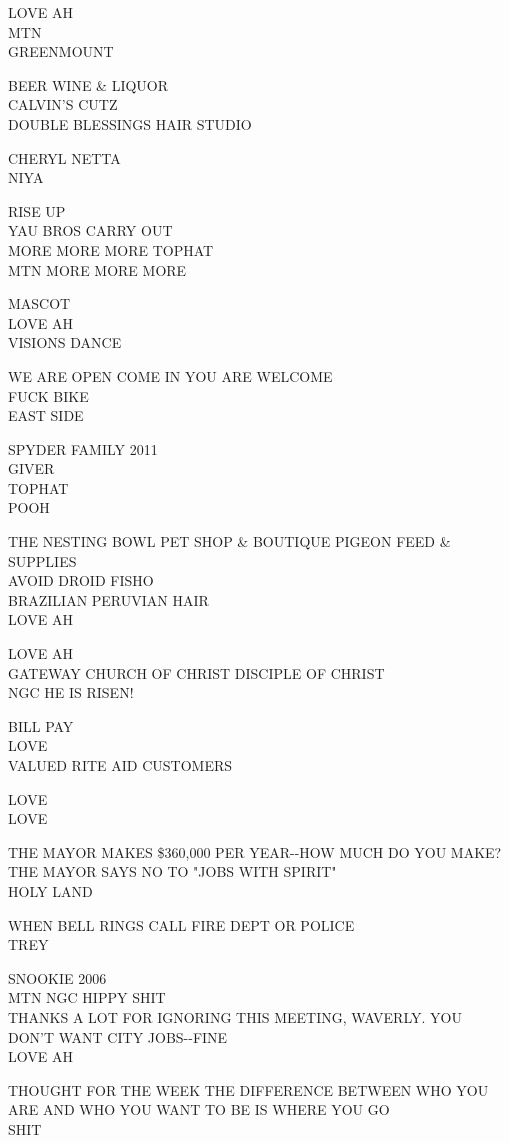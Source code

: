 \documentclass[10pt,letterpaper]{article}
\begin{document}
LOVE AH\\
MTN\\
GREENMOUNT

BEER WINE \& LIQUOR\\
CALVIN'S CUTZ\\
DOUBLE BLESSINGS HAIR STUDIO

CHERYL NETTA\\
NIYA

RISE UP\\
YAU BROS CARRY OUT\\
MORE MORE MORE TOPHAT\\
MTN MORE MORE MORE

MASCOT\\
LOVE AH\\
VISIONS DANCE

WE ARE OPEN COME IN YOU ARE WELCOME\\
FUCK BIKE\\
EAST SIDE

SPYDER FAMILY 2011\\
GIVER\\
TOPHAT\\
POOH

THE NESTING BOWL PET SHOP \& BOUTIQUE PIGEON FEED \& SUPPLIES\\
AVOID DROID FISHO\\
BRAZILIAN PERUVIAN HAIR\\
LOVE AH

LOVE AH\\
GATEWAY CHURCH OF CHRIST DISCIPLE OF CHRIST\\
NGC HE IS RISEN!

BILL PAY\\
LOVE\\
VALUED RITE AID CUSTOMERS

LOVE\\
LOVE

THE MAYOR MAKES \$360,000 PER YEAR{-}{-}HOW MUCH DO YOU MAKE?  THE MAYOR SAYS NO TO "JOBS WITH SPIRIT"\\
HOLY LAND

WHEN BELL RINGS CALL FIRE DEPT OR POLICE\\
TREY

SNOOKIE 2006\\
MTN NGC HIPPY SHIT\\
THANKS A LOT FOR IGNORING THIS MEETING, WAVERLY.  YOU DON'T WANT CITY JOBS{-}{-}FINE\\
LOVE AH

THOUGHT FOR THE WEEK THE DIFFERENCE BETWEEN WHO YOU ARE AND WHO YOU WANT TO BE IS WHERE YOU GO\\
SHIT
\end{document}
